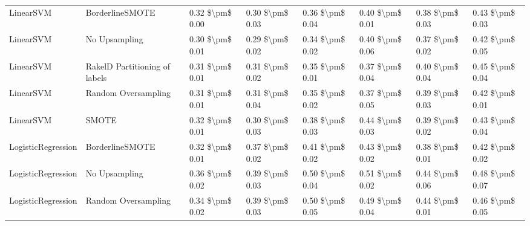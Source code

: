 \begin{tabular}{llllllll}
                      LinearSVM &               BorderlineSMOTE & 0.32 \$\textbackslash pm\$ 0.00 &           0.30 \$\textbackslash pm\$ 0.03 &       0.36 \$\textbackslash pm\$ 0.04 &        0.40 \$\textbackslash pm\$ 0.01 &                         0.38 \$\textbackslash pm\$ 0.03 &     0.43 \$\textbackslash pm\$ 0.03 \\
                      LinearSVM &                 No Upsampling & 0.30 \$\textbackslash pm\$ 0.01 &           0.29 \$\textbackslash pm\$ 0.02 &       0.34 \$\textbackslash pm\$ 0.02 &        0.40 \$\textbackslash pm\$ 0.06 &                         0.37 \$\textbackslash pm\$ 0.02 &     0.42 \$\textbackslash pm\$ 0.05 \\
                      LinearSVM & RakelD Partitioning of labels & 0.31 \$\textbackslash pm\$ 0.01 &           0.31 \$\textbackslash pm\$ 0.02 &       0.35 \$\textbackslash pm\$ 0.01 &        0.37 \$\textbackslash pm\$ 0.04 &                         0.40 \$\textbackslash pm\$ 0.04 &     0.45 \$\textbackslash pm\$ 0.04 \\
                      LinearSVM &           Random Oversampling & 0.31 \$\textbackslash pm\$ 0.01 &           0.31 \$\textbackslash pm\$ 0.04 &       0.35 \$\textbackslash pm\$ 0.02 &        0.37 \$\textbackslash pm\$ 0.05 &                         0.39 \$\textbackslash pm\$ 0.03 &     0.42 \$\textbackslash pm\$ 0.01 \\
                      LinearSVM &                         SMOTE & 0.32 \$\textbackslash pm\$ 0.01 &           0.30 \$\textbackslash pm\$ 0.03 &       0.38 \$\textbackslash pm\$ 0.03 &        0.44 \$\textbackslash pm\$ 0.03 &                         0.39 \$\textbackslash pm\$ 0.02 &     0.43 \$\textbackslash pm\$ 0.04 \\
             LogisticRegression &               BorderlineSMOTE & 0.32 \$\textbackslash pm\$ 0.01 &           0.37 \$\textbackslash pm\$ 0.02 &       0.41 \$\textbackslash pm\$ 0.02 &        0.43 \$\textbackslash pm\$ 0.02 &                         0.38 \$\textbackslash pm\$ 0.01 &     0.42 \$\textbackslash pm\$ 0.02 \\
             LogisticRegression &                 No Upsampling & 0.36 \$\textbackslash pm\$ 0.02 &           0.39 \$\textbackslash pm\$ 0.03 &       0.50 \$\textbackslash pm\$ 0.04 &        0.51 \$\textbackslash pm\$ 0.02 &                         0.44 \$\textbackslash pm\$ 0.06 &     0.48 \$\textbackslash pm\$ 0.07 \\
             LogisticRegression &           Random Oversampling & 0.34 \$\textbackslash pm\$ 0.02 &           0.39 \$\textbackslash pm\$ 0.03 &       0.50 \$\textbackslash pm\$ 0.05 &        0.49 \$\textbackslash pm\$ 0.04 &                         0.44 \$\textbackslash pm\$ 0.01 &     0.46 \$\textbackslash pm\$ 0.05 \\

\end{tabular}
